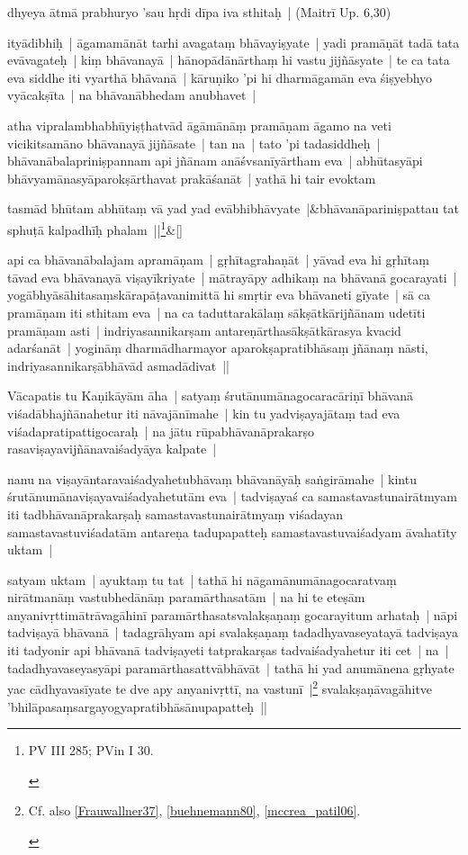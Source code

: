 \documentclass[article,12pt,a4paper]{memoir}
\begin{document}
	  \pstart dhyeya ātmā prabhuryo 'sau hṛdi dīpa iva sthitaḥ | (Maitrī Up. 6,30) 
	\pend
      

	  \pstart ityādibhiḥ | āgamamānāt tarhi avagataṃ bhāvayiṣyate | yadi pramāṇāt tadā tata evāvagateḥ | kiṃ bhāvanayā | hānopādānārthaṃ hi vastu jijñāsyate | te ca tata eva siddhe iti vyarthā bhāvanā | kāruṇiko 'pi hi dharmāgamān eva śiṣyebhyo vyācakṣīta | na bhāvanābhedam anubhavet | 
	\pend
      

	  \pstart atha vipralambhabhūyiṣṭhatvād āgāmānāṃ pramāṇam āgamo na veti vicikitsamāno bhāvanayā jijñāsate | tan na | tato 'pi tadasiddheḥ | bhāvanābalapriniṣpannam api jñānam anāśvsanīyārtham eva | abhūtasyāpi bhāvyamānasyāparokṣārthavat prakāśanāt | yathā hi tair evoktam 
	\pend
      
	    
	    \stanza[\smallbreak]
	tasmād bhūtam abhūtaṃ vā yad yad evābhibhāvyate |&bhāvanāpariniṣpattau tat sphuṭā kalpadhīḥ phalam ||\footnote{\begin{english}PV III 285; PVin I 30.\end{english}}\&[\smallbreak]


	

	  \pstart api ca bhāvanābalajam apramāṇam | gṛhītagrahaṇāt | yāvad eva hi gṛhītaṃ tāvad eva bhāvanayā viṣayīkriyate | mātrayāpy adhikaṃ na bhāvanā gocarayati | yogābhyāsāhitasaṃskārapāṭavanimittā hi smṛtir eva bhāvaneti gīyate | sā ca pramāṇam iti sthitam eva | na ca taduttarakālaṃ sākṣātkārijñānam udetīti pramāṇam asti | indriyasannikarṣam antareṇārthasākṣātkārasya kvacid adarśanāt | yogināṃ dharmādharmayor aparokṣapratibhāsaṃ jñānaṃ nāsti, indriyasannikarṣābhāvād asmadādivat || 
	\pend
      

	  \pstart Vācapatis tu Kaṇikāyām āha | satyaṃ śrutānumānagocaracāriṇī bhāvanā viśadābhajñānahetur iti nāvajānīmahe | kin tu yadviṣayajātaṃ tad eva viśadapratipattigocaraḥ | na jātu rūpabhāvanāprakarṣo rasaviṣayavijñānavaiśadyāya kalpate | 
	\pend
      

	  \pstart nanu na viṣayāntaravaiśadyahetubhāvaṃ bhāvanāyāḥ saṅgirāmahe | kintu śrutānumānaviṣayavaiśadyahetutām eva | tadviṣayaś ca samastavastunairātmyam iti tadbhāvanāprakarṣaḥ samastavastunairātmyaṃ viśadayan samastavastuviśadatām antareṇa tadupapatteḥ samastavastuvaiśadyam āvahatīty uktam | 
	\pend
      

	  \pstart satyam uktam | ayuktaṃ tu tat | tathā hi nāgamānumānagocaratvaṃ nirātmanāṃ vastubhedānāṃ paramārthasatām | na hi te eteṣām anyanivṛttimātrāvagāhinī paramārthasatsvalakṣaṇaṃ gocarayitum arhataḥ | nāpi tadviṣayā bhāvanā | tadagrāhyam api svalakṣaṇaṃ tadadhyavaseyatayā tadviṣaya iti tadyonir api bhāvanā tadviṣayeti tatprakarṣas tadvaiśadyahetur iti cet | na | tadadhyavaseyasyāpi paramārthasattvābhāvāt | tathā hi yad anumānena gṛhyate yac cādhyavasīyate te dve apy anyanivṛttī, na vastunī |\footnote{\label{note-2objects-neither-real}  \begin{english}Cf. also \cref{Frauwallner37}, \cref{buehnemann80}, \cref{mccrea_patil06}.\end{english}} svalakṣaṇāvagāhitve 'bhilāpasaṃsargayogyapratibhāsānupapatteḥ ||
	\pend
      
\end{document}
